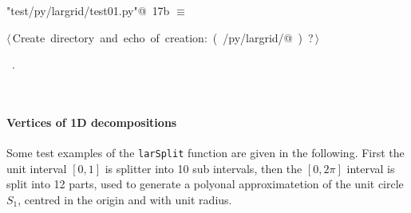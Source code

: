 \documentclass[11pt,oneside]{article}	%
\begin{document}
\begin{flushleft} \small
\begin{minipage}{\linewidth} \label{scrap27}
\protect{}\verb@"test/py/largrid/test01.py"@\nobreak\ {\footnotesize 17b }$\equiv$
\vspace{-1ex}
\begin{list}{}{} \item
\mbox{}\verb@@\hbox{$\langle\,$Create directory and echo of creation:\nobreak\ ({\footnotesize {}\label{scrap28}
 }\mbox{}\verb@test/py/largrid/@ ) {\footnotesize ?}$\,\rangle$}\verb@@\\
\mbox{}\verb@@{\NWsep}
\end{list}
\vspace{-1ex}
\footnotesize\addtolength{\baselineskip}{-1ex}
\begin{list}{}{\setlength{\itemsep}{-\parsep}\setlength{\itemindent}{-\leftmargin}}
\item \NWtxtFileDefBy\ .
\end{list}
\end{minipage}\\[4ex]
\end{flushleft}


\paragraph{Vertices of 1D decompositions}
Some test examples of the \texttt{larSplit} function are given in the following. First the unit interval $[0,1]$ is splitter into 10 sub intervals, then the $[0,2\pi]$ interval is split into 12 parts, used to generate a polyonal approximatetion of the unit circle $S_1$, centred in the origin and with unit radius.
\end{document}
